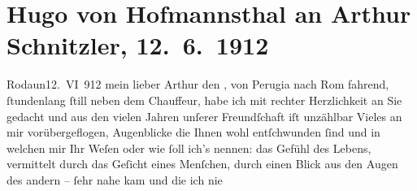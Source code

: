 

         
         \newcommand{\erwaehntePersonen}{Personen:  ?? [Chauffeur der Adlerwerke], Richard Beer-Hofmann, Samuel Fischer}
         \newcommand{\erwaehnteInstitutionen}{}
         \newcommand{\erwaehnteOrte}{Orte: Perugia, Rodaun, Rom, Wien}
         \newcommand{\erwaehnteWerke}{Werke: Arthur Schnitzler , Erzählende Schriften}
               \section[Hugo von Hofmannsthal an Arthur Schnitzler, 12. 6. 1912]{ Hugo von Hofmannsthal an Arthur Schnitzler, 12. 6. 1912}\nopagebreak{}\rehead{ }\begin{ledgroupsized}[t]{13cm}\normalsize\beginnumbering \toendnotes[C]{\smallbreak\pagebreak[2]} 
\toendnotes[C]{\smallbreak}\pstart
           \raggedleft{}{\pb}Rodaun12. VI 912\pend
           \pstart{}mein lieber Arthur\pend\pstart
           den \label{K_L02074_1v}\label{K_L02074_1h}, von Perugia nach Rom
               fahrend, ſtundenlang ſtill neben dem Chauffeur, habe ich mit rechter Herzlichkeit an Sie gedacht und aus den
               vielen Jahren unſerer Freundſchaft iſt unzählbar Vieles an mir vorübergeflogen,
               Augenblicke die Ihnen wohl entſchwunden ſind und in welchen mir Ihr Weſen oder wie
               ſoll ich’s nennen: das Gefühl des Lebens, vermittelt durch das Geſicht eines
               Menſchen, durch einen Blick aus den Augen des andern – ſehr nahe kam und die ich nie

\end{ledgroupsized}
